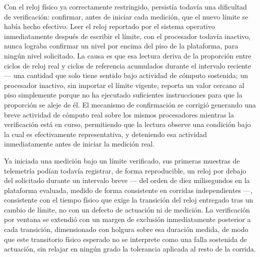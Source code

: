 \documentclass[12pt,oneside,spanish]{book}
\begin{document}
Con el reloj físico ya correctamente restringido, persistía todavía una dificultad de verificación: confirmar, antes de iniciar cada medición, que el nuevo límite se había hecho efectivo. Leer el reloj reportado por el sistema operativo inmediatamente después de escribir el límite, con el procesador todavía inactivo, nunca lograba confirmar un nivel por encima del piso de la plataforma, para ningún nivel solicitado. La causa es que esa lectura deriva de la proporción entre ciclos de reloj real y ciclos de referencia acumulados durante el intervalo reciente --- una cantidad que solo tiene sentido bajo actividad de cómputo sostenida; un procesador inactivo, sin importar el límite vigente, reporta un valor cercano al piso simplemente porque no ha ejecutado suficientes instrucciones para que la proporción se aleje de él. El mecanismo de confirmación se corrigió generando una breve actividad de cómputo real sobre los mismos procesadores mientras la verificación está en curso, permitiendo que la lectura observe una condición bajo la cual es efectivamente representativa, y deteniendo esa actividad inmediatamente antes de iniciar la medición real.

Ya iniciada una medición bajo un límite verificado, sus primeras muestras de telemetría podían todavía registrar, de forma reproducible, un reloj por debajo del solicitado durante un intervalo breve --- del orden de diez milisegundos en la plataforma evaluada, medido de forma consistente en corridas independientes ---, consistente con el tiempo físico que exige la transición del reloj entregado tras un cambio de límite, no con un defecto de actuación ni de medición. La verificación por ventana se extendió con un margen de exclusión inmediatamente posterior a cada transición, dimensionado con holgura sobre esa duración medida, de modo que este transitorio físico esperado no se interprete como una falla sostenida de actuación, sin relajar en ningún grado la tolerancia aplicada al resto de la corrida.
\end{document}

